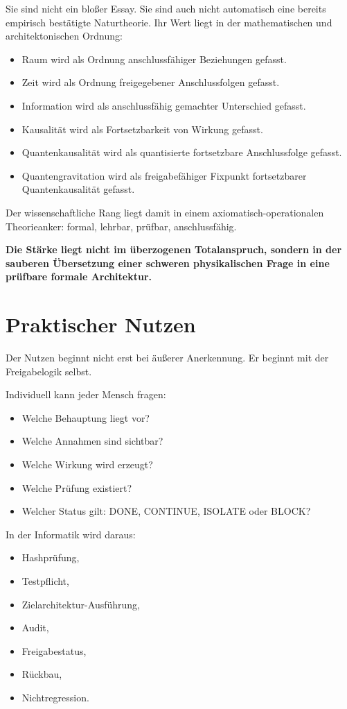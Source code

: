 \documentclass[11pt,a4paper,oneside]{scrartcl}
\theoremstyle{qikstyle}
\newenvironment{merksatz}{\begin{center}\begin{minipage}{0.92\linewidth}\sffamily\bfseries}{\end{minipage}\end{center}}
\begin{document}
Sie sind nicht ein bloßer Essay. Sie sind auch nicht automatisch eine bereits empirisch bestätigte Naturtheorie. Ihr Wert liegt in der mathematischen und architektonischen Ordnung:
\begin{itemize}
\item Raum wird als Ordnung anschlussfähiger Beziehungen gefasst.
\item Zeit wird als Ordnung freigegebener Anschlussfolgen gefasst.
\item Information wird als anschlussfähig gemachter Unterschied gefasst.
\item Kausalität wird als Fortsetzbarkeit von Wirkung gefasst.
\item Quantenkausalität wird als quantisierte fortsetzbare Anschlussfolge gefasst.
\item Quantengravitation wird als freigabefähiger Fixpunkt fortsetzbarer Quantenkausalität gefasst.
\end{itemize}

Der wissenschaftliche Rang liegt damit in einem axiomatisch-operationalen Theorieanker: formal, lehrbar, prüfbar, anschlussfähig.

\begin{merksatz}
Die Stärke liegt nicht im überzogenen Totalanspruch, sondern in der sauberen Übersetzung einer schweren physikalischen Frage in eine prüfbare formale Architektur.
\end{merksatz}
\newpage

\section{Praktischer Nutzen}

Der Nutzen beginnt nicht erst bei äußerer Anerkennung. Er beginnt mit der Freigabelogik selbst.

Individuell kann jeder Mensch fragen:
\begin{itemize}
\item Welche Behauptung liegt vor?
\item Welche Annahmen sind sichtbar?
\item Welche Wirkung wird erzeugt?
\item Welche Prüfung existiert?
\item Welcher Status gilt: DONE, CONTINUE, ISOLATE oder BLOCK?
\end{itemize}

In der Informatik wird daraus:
\begin{itemize}
\item Hashprüfung,
\item Testpflicht,
\item Zielarchitektur-Ausführung,
\item Audit,
\item Freigabestatus,
\item Rückbau,
\item Nichtregression.
\end{itemize}
\end{document}
